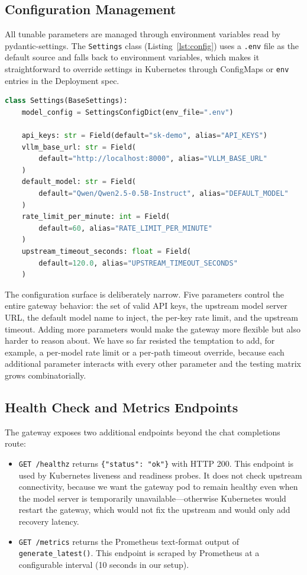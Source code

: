 \documentclass[10pt,journal]{IEEEtran}
\begin{document}
\subsection{Configuration Management}

All tunable parameters are managed through environment variables read by pydantic-settings. The \texttt{Settings} class (Listing~\ref{lst:config}) uses a \texttt{.env} file as the default source and falls back to environment variables, which makes it straightforward to override settings in Kubernetes through ConfigMaps or \texttt{env} entries in the Deployment spec.

\begin{lstlisting}[language=Python, caption={Configuration class in \texttt{gateway/app/config.py}.}, label={lst:config}]
class Settings(BaseSettings):
    model_config = SettingsConfigDict(env_file=".env")

    api_keys: str = Field(default="sk-demo", alias="API_KEYS")
    vllm_base_url: str = Field(
        default="http://localhost:8000", alias="VLLM_BASE_URL"
    )
    default_model: str = Field(
        default="Qwen/Qwen2.5-0.5B-Instruct", alias="DEFAULT_MODEL"
    )
    rate_limit_per_minute: int = Field(
        default=60, alias="RATE_LIMIT_PER_MINUTE"
    )
    upstream_timeout_seconds: float = Field(
        default=120.0, alias="UPSTREAM_TIMEOUT_SECONDS"
    )
\end{lstlisting}

The configuration surface is deliberately narrow. Five parameters control the entire gateway behavior: the set of valid API keys, the upstream model server URL, the default model name to inject, the per-key rate limit, and the upstream timeout. Adding more parameters would make the gateway more flexible but also harder to reason about. We have so far resisted the temptation to add, for example, a per-model rate limit or a per-path timeout override, because each additional parameter interacts with every other parameter and the testing matrix grows combinatorially.

\subsection{Health Check and Metrics Endpoints}

The gateway exposes two additional endpoints beyond the chat completions route:

\begin{itemize}
  \item \texttt{GET /healthz} returns \texttt{\{"status": "ok"\}} with HTTP 200. This endpoint is used by Kubernetes liveness and readiness probes. It does not check upstream connectivity, because we want the gateway pod to remain healthy even when the model server is temporarily unavailable---otherwise Kubernetes would restart the gateway, which would not fix the upstream and would only add recovery latency.
  \item \texttt{GET /metrics} returns the Prometheus text-format output of \texttt{generate\_latest()}. This endpoint is scraped by Prometheus at a configurable interval (10 seconds in our setup).
\end{itemize}
\end{document}
